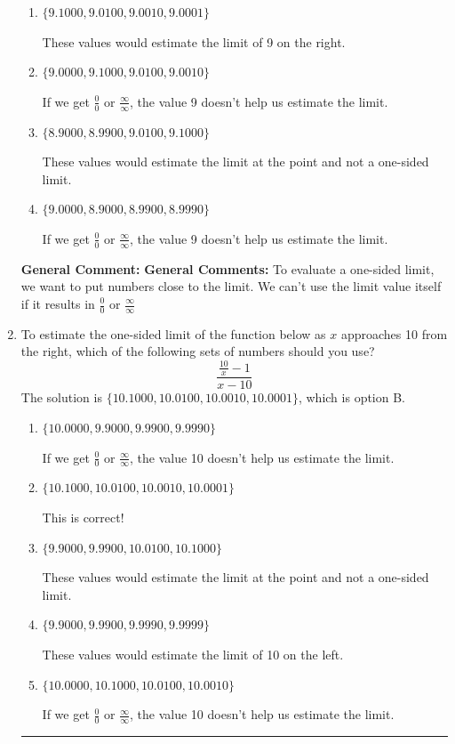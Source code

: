 \documentclass{extbook}[14pt]
\newcommand{\litem}[1]{\item #1

\rule{\textwidth}{0.4pt}}
\begin{document}
\begin{enumerate}
{\begin{enumerate}[label=\Alph*.]
This is correct!
\item \( \{ 9.1000, 9.0100, 9.0010, 9.0001 \} \)

These values would estimate the limit of 9 on the right.
\item \( \{ 9.0000, 9.1000, 9.0100, 9.0010 \} \)

If we get $\frac{0}{0}$ or $\frac{\infty}{\infty}$, the value 9 doesn't help us estimate the limit.
\item \( \{ 8.9000, 8.9900, 9.0100, 9.1000 \} \)

These values would estimate the limit at the point and not a one-sided limit.
\item \( \{ 9.0000, 8.9000, 8.9900, 8.9990 \} \)

If we get $\frac{0}{0}$ or $\frac{\infty}{\infty}$, the value 9 doesn't help us estimate the limit.
\end{enumerate}

\textbf{General Comment:} \textbf{General Comments:} To evaluate a one-sided limit, we want to put numbers close to the limit. We can't use the limit value itself if it results in $\frac{0}{0}$ or $\frac{\infty}{\infty}$
}
\litem{
To estimate the one-sided limit of the function below as $x$ approaches 10 from the right, which of the following sets of numbers should you use?
\[ \frac{\frac{10}{x} - 1}{x - 10} \]The solution is \( \{ 10.1000, 10.0100, 10.0010, 10.0001 \} \), which is option B.\begin{enumerate}[label=\Alph*.]
\item \( \{ 10.0000, 9.9000, 9.9900, 9.9990 \} \)

If we get $\frac{0}{0}$ or $\frac{\infty}{\infty}$, the value 10 doesn't help us estimate the limit.
\item \( \{ 10.1000, 10.0100, 10.0010, 10.0001 \} \)

This is correct!
\item \( \{ 9.9000, 9.9900, 10.0100, 10.1000 \} \)

These values would estimate the limit at the point and not a one-sided limit.
\item \( \{ 9.9000, 9.9900, 9.9990, 9.9999 \} \)

These values would estimate the limit of 10 on the left.
\item \( \{ 10.0000, 10.1000, 10.0100, 10.0010 \} \)

If we get $\frac{0}{0}$ or $\frac{\infty}{\infty}$, the value 10 doesn't help us estimate the limit.
\end{enumerate}

}
\end{enumerate}
\end{document}
